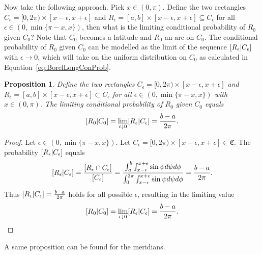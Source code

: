 \documentclass[a4paper]{report}
\theoremstyle{plain}
\newtheorem{proposition}[theorem]{Proposition}
\theoremstyle{definition}
\theoremstyle{remark}
\numberwithin{equation}{chapter}
\let\P\relax
\DeclareMathOperator{\P}{\mathbb{P}}
\DeclareMathOperator{\1}{\mathbbm{1}}
\begin{document}
Now take the following approach. Pick $x\in(0,\pi)$. Define the two rectangles $C_\epsilon=[0,2\pi)\times[x-\epsilon,x+\epsilon]$ and $R_\epsilon=[a,b]\times[x-\epsilon,x+\epsilon]\subseteq C_\epsilon$ for all ${\epsilon\in(0,\min\{\pi-x,x\})}$, then what is the limiting conditional probability of $R_0$ given $C_0$? Note that $C_0$ becomes a latitude and $R_0$ an arc on $C_0$. The conditional probability of $R_0$ given $C_0$ can be modelled as the limit of the sequence $\P[R_\epsilon|C_\epsilon]$ with $\epsilon\to0$, which will take on the uniform distribution on $C_0$ as calculated in Equation~\ref{eq:BorelLongConProb}.
\begin{proposition}\label{prop:BorelLongBayes}
Define the two rectangles $C_\epsilon=[0,2\pi)\times[x-\epsilon,x+\epsilon]$ and $R_\epsilon=[a,b]\times[x-\epsilon,x+\epsilon]\subset C_\epsilon$ for all $\epsilon\in(0,\min\{\pi-x,x\})$ with $x\in(0,\pi)$. The limiting conditional probability of $R_0$ given $C_0$ equals
\begin{equation}
\P[R_0|C_0]=\lim_{\epsilon\downarrow0}\P[R_\epsilon|C_\epsilon]=\frac{b-a}{2\pi}.
\end{equation}
\end{proposition}
\begin{proof}
Let $\epsilon\in(0,\min\{\pi-x,x\})$. Let $C_\epsilon=[0,2\pi)\times[x-\epsilon,x+\epsilon]\in\mathfrak{C}$. The probability $\P[R_\epsilon|C_\epsilon]$ equals
\begin{equation}
\P[R_\epsilon|C_\epsilon]=\frac{\P[R_\epsilon\cap C_\epsilon]}{\P[C_\epsilon]}=\frac{\int_{a}^{b}\int_{x-\epsilon}^{x+\epsilon}\sin\psi d\psi d\phi}{\int_{0}^{2\pi}\int_{x-\epsilon}^{x+\epsilon}\sin\psi d\psi d\phi}=\frac{b-a}{2\pi}.
\end{equation}
Thus $\P[R_\epsilon|C_\epsilon]=\frac{b-a}{2\pi}$ holds for all possible $\epsilon$, resulting in the limiting value
\begin{equation}
\P[R_0|C_0]=\lim_{\epsilon\downarrow0}\P[R_\epsilon|C_\epsilon]=\frac{b-a}{2\pi}.
\end{equation}
\end{proof}

A same proposition can be found for the meridians.
\end{document}
